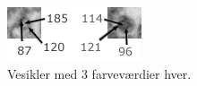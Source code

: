 \begin{figure}[H]
	\centering
	\includegraphics[scale=5]{files/premethod/img/ves_colors.png}
	\caption{Vesikler med 3 farveværdier hver.\label{fig:premethod_vescolors}}
\end{figure}


